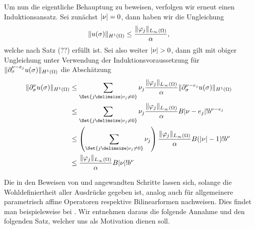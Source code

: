 \begin{Satz}
\begin{Beweis}
        Um nun die eigentliche Behauptung zu beweisen, verfolgen wir erneut einen Induktionsansatz.
        Sei zunächst $\lvert\nu\rvert = 0$, dann haben wir die Ungleichung
        \begin{equation}
            \lVert u(\sigma)\rVert_{H^{1}(\Omega)} \leq \frac{\lVert\varphi_{j}\rVert_{L_{\infty}(\Omega)}}{\alpha},
        \end{equation}
        welche nach Satz (??) erfüllt ist.
        Sei also weiter $\lvert\nu\rvert > 0$, dann gilt mit obiger Ungleichung unter Verwendung der Induktionsvoraussetzung für $\lVert\partial^{\nu - e_{j}}_{\sigma} u(\sigma)\rVert_{H^{1}(\Omega)}$ die Abschätzung
        \begin{align}
            \norm{\partial^{\nu}_{\sigma} u(\sigma)}_{H^{1}(\Omega)}
            &\leq
            \sum_{\Set{j \given \nu_{j} \neq 0}} \nu_{j} \frac{\norm{\varphi_{j}}_{L_{\infty}(\Omega)}}{\alpha} \norm{\partial^{\nu - e_{j}}_{\sigma} u(\sigma)}_{H^{1}(\Omega)}
            \\&\leq
            \sum_{\Set{j \given \nu_{j} \neq 0}} \nu_{j} \frac{\norm{\varphi_{j}}_{L_{\infty}(\Omega)}}{\alpha} B \abs{\nu - e_{j}}! b^{\nu - e_{j}}
            \\&\leq
            \left( \sum_{\Set{j \given \nu_{j} \neq 0}} \nu_{j} \right)  \frac{\norm{\varphi_{j}}_{L_{\infty}(\Omega)}}{\alpha} B (\abs{\nu} - 1)! b^{\nu}
            \\&\leq
            \frac{\norm{\varphi_{j}}_{L_{\infty}(\Omega)}}{\alpha} B \abs{\nu}! b^{\nu}
        \end{align}
    \end{Beweis}
\end{Satz}


Die in den Beweisen von  und  angewandten Schritte lassen sich, solange die Wohldefiniertheit aller Ausdrücke gegeben ist, analog auch für allgemeinere parametrisch affine Operatoren respektive Bilinearformen nachweisen.
Dies findet man beispielsweise bei \textcite{Kunoth:2013ef}.
Wir entnehmen daraus die folgende Annahme und den folgenden Satz, welcher uns als Motivation dienen soll.


